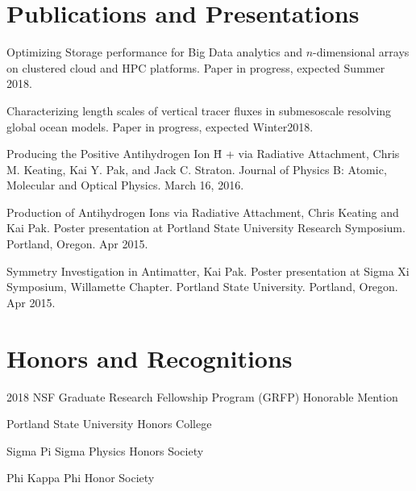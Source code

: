 \documentclass[]{deedy-resume-openfont}
\begin{document}
\begin{minipage}[t]{0.66\textwidth}
\section{Publications and Presentations}
\vspace{\topsep}
\begin{tightemize}
    \item Optimizing Storage performance for Big Data analytics and $n$-dimensional arrays on clustered cloud and HPC platforms. Paper in progress, expected Summer 2018.
    \item Characterizing length scales of vertical tracer fluxes in submesoscale resolving global ocean models. Paper in progress, expected Winter2018.
    \item Producing the Positive Antihydrogen Ion H̄ + via Radiative Attachment, Chris M. Keating, Kai Y. Pak, and Jack C. Straton. Journal of Physics B: Atomic, Molecular and Optical Physics. March 16, 2016.
    \item Production of Antihydrogen Ions via Radiative Attachment, Chris Keating and Kai Pak. Poster presentation at Portland State University Research Symposium. Portland, Oregon. Apr 2015.
    \item Symmetry Investigation in Antimatter, Kai Pak. Poster presentation at Sigma Xi Symposium, Willamette
Chapter. Portland State University. Portland, Oregon. Apr 2015.
\end{tightemize}


\section{Honors and Recognitions}
\vspace{\topsep} 
\begin{tightemize}
    \item 2018 NSF Graduate Research Fellowship Program (GRFP) Honorable Mention\\
    \item Portland State University Honors College\\
    \item Sigma Pi Sigma Physics Honors Society\\
    \item Phi Kappa Phi Honor Society\\
\end{tightemize}


\end{minipage}
\end{document}
